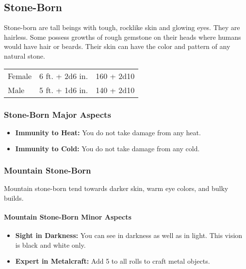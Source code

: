 \begin{multicols}{2}
\subsection{Stone-Born}

Stone-born are tall beings with tough, rocklike skin and glowing eyes. They are hairless. Some
possess growths of rough gemstone on their heads where humans would have hair or beards. Their
skin can have the color and pattern of any natural stone.

\begin{center}
\begin{xtabular}{|l|l|l|}
Female & 6 ft. + 2d6 in. & 160 + 2d10 \\
Male & 5 ft. + 1d6 in. & 140 + 2d10 \\
\hline
\end{xtabular}
\end{center}

\subsubsection{Stone-Born Major Aspects}

\begin{itemize}
    \item \textbf{Immunity to Heat:} You do not take damage from any heat.
    \item \textbf{Immunity to Cold:} You do not take damage from any cold.
\end{itemize}

\subsubsection{Mountain Stone-Born}

Mountain stone-born tend towards darker skin, warm eye colors, and bulky builds.

\paragraph{Mountain Stone-Born Minor Aspects}

\begin{itemize}
    \item \textbf{Sight in Darkness:} You can see in darkness as well as in light. This vision is black and white only.
    \item \textbf{Expert in Metalcraft:} Add 5 to all rolls to craft metal objects.
\end{itemize}


\end{multicols}
